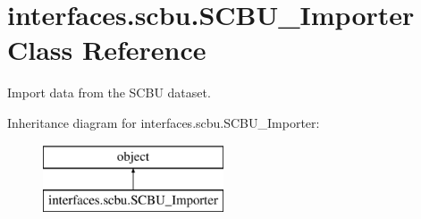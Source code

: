 \hypertarget{classinterfaces_1_1scbu_1_1_s_c_b_u___importer}{\section{interfaces.\-scbu.\-S\-C\-B\-U\-\_\-\-Importer Class Reference}
\label{classinterfaces_1_1scbu_1_1_s_c_b_u___importer}
}


Import data from the S\-C\-B\-U dataset.  


Inheritance diagram for interfaces.\-scbu.\-S\-C\-B\-U\-\_\-\-Importer\-:\begin{figure}[H]
\begin{center}
\leavevmode
\includegraphics[height=2.000000cm]{classinterfaces_1_1scbu_1_1_s_c_b_u___importer}
\end{center}
\end{figure}
